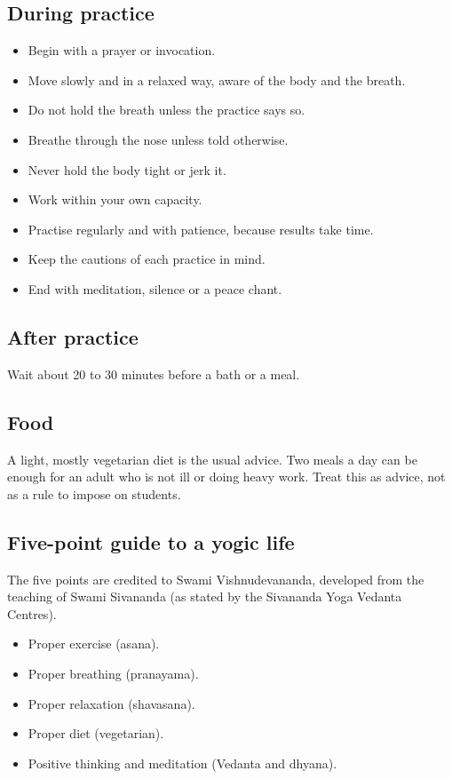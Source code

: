 \subsection*{During practice}
\begin{itemize}
\item Begin with a prayer or invocation.
\item Move slowly and in a relaxed way, aware of the body and the breath.
\item Do not hold the breath unless the practice says so.
\item Breathe through the nose unless told otherwise.
\item Never hold the body tight or jerk it.
\item Work within your own capacity.
\item Practise regularly and with patience, because results take time.
\item Keep the cautions of each practice in mind.
\item End with meditation, silence or a peace chant.
\end{itemize}

\subsection*{After practice}
Wait about 20 to 30 minutes before a bath or a meal.

\subsection*{Food}
A light, mostly vegetarian diet is the usual advice. Two meals a day can be enough for an adult who is not ill or doing heavy work. Treat this as advice, not as a rule to impose on students.

\subsection*{Five-point guide to a yogic life}
The five points are credited to Swami Vishnudevananda, developed from the teaching of Swami Sivananda (as stated by the Sivananda Yoga Vedanta Centres).
\begin{itemize}
\item Proper exercise (asana).
\item Proper breathing (pranayama).
\item Proper relaxation (shavasana).
\item Proper diet (vegetarian).
\item Positive thinking and meditation (Vedanta and dhyana).
\end{itemize}

